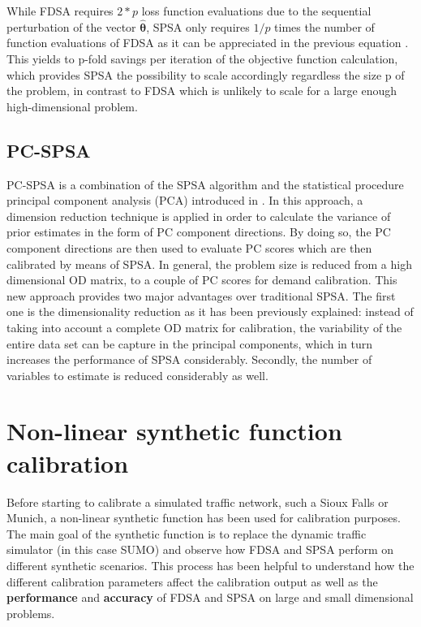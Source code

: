 While FDSA requires \(2*p\) loss function evaluations due to the sequential perturbation of the vector \(\boldsymbol{\hat{\theta}}\), SPSA only requires \(1/p\) times the number of function evaluations of FDSA as it can be appreciated in the previous equation \parencite{spall:2012}. This yields to p-fold savings per iteration of the objective function calculation, which provides SPSA the possibility to scale accordingly regardless the size p of the problem, in contrast to FDSA which is unlikely to scale for a large enough high-dimensional problem. 

\subsection{PC-SPSA}
PC-SPSA is a combination of the SPSA algorithm and the statistical procedure principal component analysis (PCA) introduced in \parencite{pcspsa:2018}. In this approach, a dimension reduction technique is applied in order to calculate the variance of prior estimates in the form of PC component directions. By doing so, the PC component directions are then used to evaluate PC scores which are then calibrated by means of SPSA. In general, the problem size is reduced from a high dimensional OD matrix, to a couple of PC scores for demand calibration. This new approach provides two major advantages over traditional SPSA. The first one is the dimensionality reduction as it has been previously explained: instead of taking into account a complete OD matrix for calibration, the variability of the entire data set can be capture in the principal components, which in turn increases the performance of SPSA considerably. Secondly, the number of variables to estimate is reduced considerably as well. 

\section{Non-linear synthetic function calibration}
Before starting to calibrate a simulated traffic network, such a Sioux Falls or Munich, a non-linear synthetic function has been used for calibration purposes. The main goal of the synthetic function is to replace the dynamic traffic simulator (in this case SUMO) and observe how FDSA and SPSA perform on different synthetic scenarios. This process has been helpful to understand how the different calibration parameters affect the calibration output as well as the \textbf{performance} and \textbf{accuracy} of FDSA and SPSA on large and small dimensional problems.

